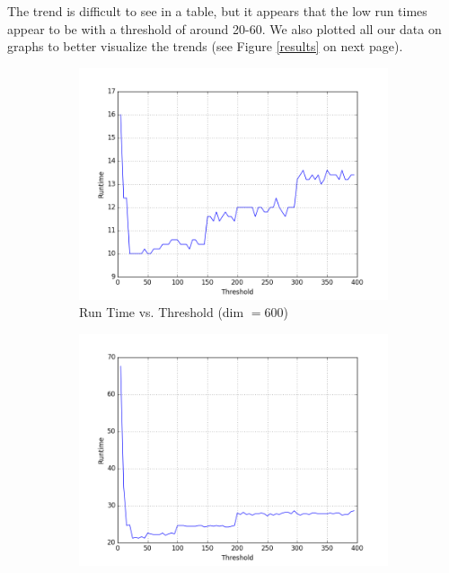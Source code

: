 \documentclass[12pt]{article}
\begin{document}
The trend is difficult to see in a table, but it appears that the low run times appear to be with a threshold of around 20-60. We also plotted all our data on graphs to better visualize the trends (see Figure \ref{results} on next page). \\

\begin{figure}
\centering
\begin{subfigure}{.5\textwidth}
  \centering
  \includegraphics[width=\linewidth]{data/d600.png}
  \caption{Run Time vs. Threshold (dim $= 600$)}
  \label{fig:sub1}
\end{subfigure}%
\begin{subfigure}{.5\textwidth}
  \centering
  \includegraphics[width=\linewidth]{data/d800.png}

\end{subfigure}
\end{figure}
\end{document}
